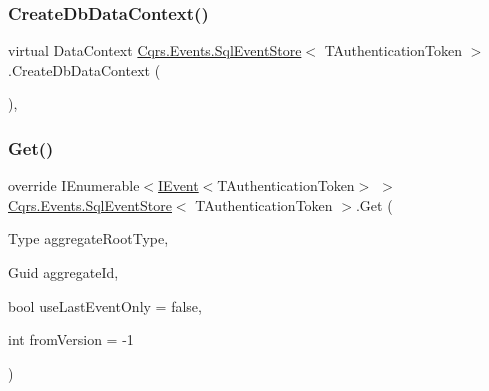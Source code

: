 \mbox{\label{classCqrs_1_1Events_1_1SqlEventStore_a47a3fb01f9ccc65ec52ad96236cea3fb_a47a3fb01f9ccc65ec52ad96236cea3fb}} 
\subsubsection{\texorpdfstring{Create\+Db\+Data\+Context()}{CreateDbDataContext()}}
{\footnotesize\ttfamily virtual Data\+Context \hyperlink{classCqrs_1_1Events_1_1SqlEventStore}{Cqrs.\+Events.\+Sql\+Event\+Store}$<$ T\+Authentication\+Token $>$.Create\+Db\+Data\+Context (\begin{DoxyParamCaption}{ }\end{DoxyParamCaption})\hspace{0.3cm}{\ttfamily [protected]}, {\ttfamily [virtual]}}

\mbox{\label{classCqrs_1_1Events_1_1SqlEventStore_a7e32a08a015642a5bc1cefa6998e6f11_a7e32a08a015642a5bc1cefa6998e6f11}} 
\subsubsection{\texorpdfstring{Get()}{Get()}\hspace{0.1cm}{\footnotesize\ttfamily [1/2]}}
{\footnotesize\ttfamily override I\+Enumerable$<$\hyperlink{interfaceCqrs_1_1Events_1_1IEvent}{I\+Event}$<$T\+Authentication\+Token$>$ $>$ \hyperlink{classCqrs_1_1Events_1_1SqlEventStore}{Cqrs.\+Events.\+Sql\+Event\+Store}$<$ T\+Authentication\+Token $>$.Get (\begin{DoxyParamCaption}\item[{Type}]{aggregate\+Root\+Type,  }\item[{Guid}]{aggregate\+Id,  }\item[{bool}]{use\+Last\+Event\+Only = {\ttfamily false},  }\item[{int}]{from\+Version = {\ttfamily -\/1} }\end{DoxyParamCaption})\hspace{0.3cm}{\ttfamily [virtual]}}



